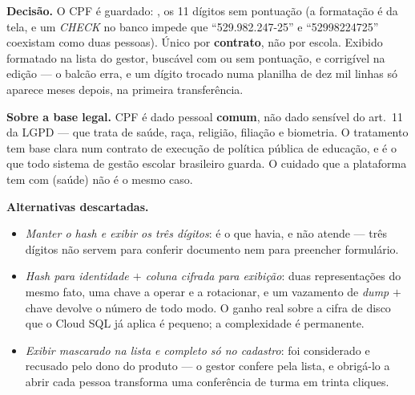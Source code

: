 \textbf{Decisão.} O CPF é guardado: , os 11 dígitos sem pontuação
(a formatação é da tela, e um \emph{CHECK} no banco impede que
\enquote{529.982.247-25} e \enquote{52998224725} coexistam como duas pessoas).
Único por \textbf{contrato}, não por escola. Exibido formatado na lista do gestor,
buscável com ou sem pontuação, e corrigível na edição --- o balcão erra, e um
dígito trocado numa planilha de dez mil linhas só aparece meses depois, na
primeira transferência.

\textbf{Sobre a base legal.} CPF é dado pessoal \textbf{comum}, não dado sensível
do art.~11 da LGPD --- que trata de saúde, raça, religião, filiação e biometria.
O tratamento tem base clara num contrato de execução de política pública de
educação, e é o que todo sistema de gestão escolar brasileiro guarda. O cuidado
que a plataforma tem com  (saúde) não é o mesmo caso.

\textbf{Alternativas descartadas.}
\begin{itemize}
  \item \emph{Manter o \emph{hash} e exibir os três dígitos}: é o que havia, e não
    atende --- três dígitos não servem para conferir documento nem para preencher
    formulário.
  \item \emph{\emph{Hash} para identidade $+$ coluna cifrada para exibição}: duas
    representações do mesmo fato, uma chave a operar e a rotacionar, e um vazamento
    de \emph{dump} $+$ chave devolve o número de todo modo. O ganho real sobre a
    cifra de disco que o Cloud SQL já aplica é pequeno; a complexidade é
    permanente.
  \item \emph{Exibir mascarado na lista e completo só no cadastro}: foi
    considerado e recusado pelo dono do produto --- o gestor confere pela lista, e
    obrigá-lo a abrir cada pessoa transforma uma conferência de turma em trinta
    cliques.
\end{itemize}

